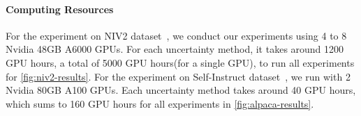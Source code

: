 \paragraph{Computing Resources}
For the experiment on NIV2 dataset~\cite{Wang2022SuperNaturalInstructionsGV}, we conduct our experiments using 4 to 8 Nvidia 48GB A6000 GPUs. For each uncertainty method, it takes around 1200 GPU hours, a total of 5000 GPU hours(for a single GPU), to run all experiments for \autoref{fig:niv2-results}. For the experiment on Self-Instruct dataset~\cite{wang2022self}, we run with 2 Nvidia 80GB A100 GPUs. Each uncertainty method takes around 40 GPU hours, which sums to 160 GPU hours for all experiments in \autoref{fig:alpaca-results}.
